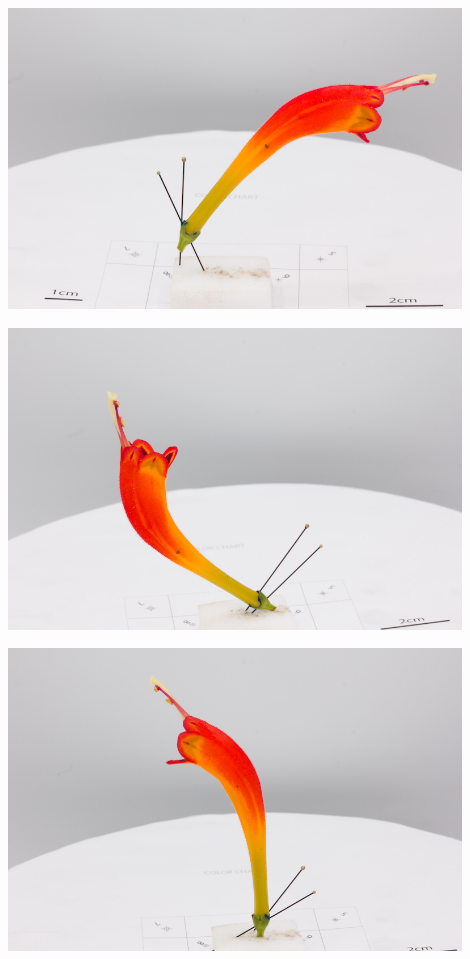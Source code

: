 \documentclass[
]{book}
\begin{document}
\includegraphics[width=0.9\textwidth,height=\textheight]{Figures/flowerplacement_1.png}

\includegraphics[width=0.9\textwidth,height=\textheight]{Figures/flowerplacement_2.jpg}

\includegraphics[width=0.9\textwidth,height=\textheight]{Figures/flowerplacement_3.jpg}
\end{document}
